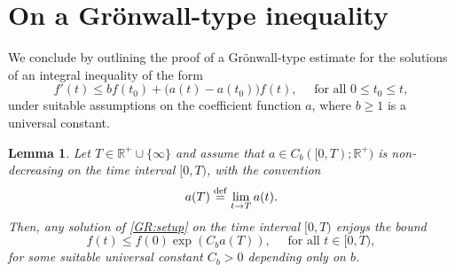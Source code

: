 \documentclass[11pt, leqno, a4paper,]{amsart}
\newtheorem{lemma}[theorem]{Lemma}
\theoremstyle{remark}
\numberwithin{equation}{section}
\newcommand*{\bydef}{\overset{\rm def}{=}}
\begin{document}
\section{On a Gr\"onwall-type inequality} 
We conclude by outlining the proof of a Gr\"onwall-type estimate for the solutions of an integral inequality of the form
\begin{equation}\label{GR:setup}
	f'(t) \leq bf(t_0) + \big(a(t) -a(t_0)\big) f(t), \quad \text{ for all } 0\leq t_0 \leq t,
\end{equation}
under suitable assumptions on the coefficient function $a$, where $b\geq 1$ is a universal constant.
\begin{lemma}\label{lemma:bootstrap} Let $T\in \mathbb R^+\cup \{ \infty\}$ and  assume that $a\in C_b([0,T); \mathbb R^+)$ is non-decreasing on the time interval $[0,T)$, with the convention 
\begin{equation*}
	a(T)\bydef \lim_{t\to T} a(t).
\end{equation*}
	Then, any solution of \eqref{GR:setup} on the time interval $[0,T)$ enjoys the bound
	\begin{equation*}
		f(t) \leq f(0) \exp \left( C_b   a(T)\right), \quad \text{ for all } t \in [0,T),
	\end{equation*}
	for some suitable universal constant $C_b>0$ depending only on $b$.
\end{lemma}
\end{document}
